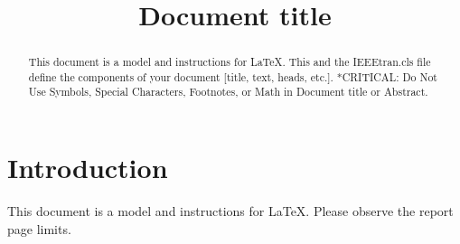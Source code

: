\documentclass[conference]{IEEEtran}
\begin{document}
%
\title{Document title}

\author{
\and
{}
\and
{}
}


\maketitle

\thispagestyle{firststyle}
\renewcommand{\headrulewidth}{0in}
\pagestyle{empty}


\pagestyle{fancy}
\chead{\fontsize{8}{10} \selectfont \textit{} }



\begin{abstract}
This document is a model and instructions for \LaTeX.
This and the IEEEtran.cls file define the components of your document [title, text, heads, etc.]. *CRITICAL: Do Not Use Symbols, Special Characters, Footnotes, 
or Math in Document title or Abstract.
\end{abstract}


\IEEEpeerreviewmaketitle



\section{Introduction}
This document is a model and instructions for \LaTeX.
Please observe the report page limits. 
\end{document}
